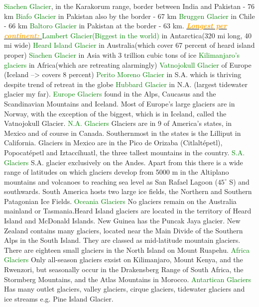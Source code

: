 \documentclass{article}
\newcommand{\green}[1]{\textcolor{green}{#1}}
\newcommand{\orange}[1]{\textcolor{orange}{#1}}
\newcommand{\mysub}[1]{\underline{\textbf{{\textit{\orange{#1}}}}}}
\newcommand{\mysubsub}[1]{{{\green{#1}}}}
\begin{document}
\begin{multicols*}{4}
		    \mysubsub {Siachen Glacier}, in the Karakorum range, border between India and Pakistan - 76 km
		    \mysubsub {Biafo Glacier} in Pakistan also by the border - 67 km
		    \mysubsub {Bruggen Glacier} in Chile - 66 km
		    \mysubsub {Baltoro Glacier} in Pakistan at the border - 63 km. \mysub{Longest per continent: } 
		    \mysubsub {Lambert Glacier(Biggest in the world)} in Antarctica(320 mi long, 40 mi wide)
		    \mysubsub {Heard Island Glacier} in Australia(which cover 67 percent of heard island proper)
		    \mysubsub {Siachen Glacier} in Asia with 3 trillion cubic tons of ice
		    \mysubsub {Kilimanjaro's glaciers} in Africa(which are retreating alarmingly)
		    \mysubsub {Vatnojokull Glacier} of Europe (Iceland --> covers 8 percent)
		    \mysubsub {Perito Moreno Glacier} in S.A. which is thriving despite trend of retreat in the globe
		    \mysubsub {Hubbard Glacier} in N.A. (largest tidewater glacier my far). 
		    \mysubsub{Europe Glaciers} found in the Alps, Caucasus and the Scandinavian Mountains and Iceland. Most of Europe's large glaciers are in Norway, with the exception of the biggest, which is in Iceland, called the Vatnojokull Glacier.
		    \mysubsub{N.A. Glaciers} Glaciers are in 9 of America's states, in Mexico and of course in Canada. Southernmost in the states is the Lilliput in California. Glaciers in Mexico are in the Pico de Orizaba (Citlaltépetl), Popocatépetl and Iztaccíhuatl, the three tallest mountains in the country.
		    \mysubsub{S.A. Glaciers} S.A. glacier exclusively on the Andes. Apart from this there is a wide range of latitudes on which glaciers develop from 5000 m in the Altiplano mountains and volcanoes to reaching sea level as San Rafael Lagoon ($ 45^\circ $ S) and southwards. South America hosts two large ice fields, the Northern and Southern Patagonian Ice Fields.
		    \mysubsub{Oceania Glaciers} No glaciers remain on the Australia mainland or Tasmania.Heard Island glaciers are located in the territory of Heard Island and McDonald Islands. New Guinea has the Puncak Jaya glacier. New Zealand contains many glaciers,  located near the Main Divide of the Southern Alps in the South Island. They are classed as mid-latitude mountain glaciers. There are eighteen small glaciers in the North Island on Mount Ruapehu.
		    \mysubsub{Africa Glaciers} Only all-season glaciers exsist on Kilimanjaro, Mount Kenya, and the Rwenzori, but seasonally occur in the Drakensberg Range of South Africa, the Stormberg Mountains, and the Atlas Mountains in Morocco.
		    \mysubsub{Antartican Glaciers} Has many outlet glaciers, valley glaciers, cirque glaciers, tidewater glaciers and ice streams e.g. Pine Island Glacier. 

\end{multicols*}
\end{document}
